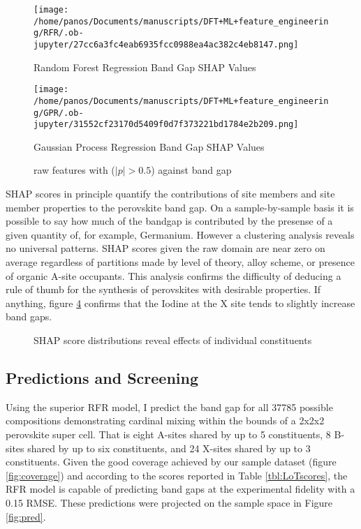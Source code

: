 \begin{figure}[htbp]
\centering
\texttt{[image: /home/panos/Documents/manuscripts/DFT+ML+feature\_engineering/RFR/.ob-jupyter/27cc6a3fc4eab6935fcc0988ea4ac382c4eb8147.png]}
\caption{\label{fig:rfrSHAP} Random Forest Regression Band Gap SHAP Values}
\end{figure}

\begin{figure}[htbp]
\centering
\texttt{[image: /home/panos/Documents/manuscripts/DFT+ML+feature\_engineering/GPR/.ob-jupyter/31552cf23170d5409f0d7f373221bd1784e2b209.png]}
\caption{\label{fig:gprSHAP} Gaussian Process Regression Band Gap SHAP Values}
\end{figure}

 
\begin{figure}[htbp]
\centering

\caption{\label{fig:rpear} raw features with (\(|p| > 0.5\)) against band gap}
\end{figure}

SHAP scores in principle quantify the contributions of site members and site member properties to the perovskite band gap.
On a sample-by-sample basis it is possible to say how much of the bandgap is contributed by the presense of a given quantity of, for example, Germanium.
However a clustering analysis reveals no universal patterns.
SHAP scores given the raw domain are near zero on average regardless of partitions made by level of theory, alloy scheme, or presence of organic A-site occupants.
This analysis confirms the difficulty of deducing a rule of thumb for the synthesis of perovskites with desirable properties.
If anything, figure \ref{fig:clusters} confirms that the Iodine at the X site tends to slightly increase band gaps.

 
\begin{figure}[htbp]
\centering

\caption{\label{fig:clusters} SHAP score distributions reveal effects of individual constituents}
\end{figure}

\subsection{Predictions and Screening}
\label{sec:org2194f76}
Using the superior RFR model, I predict the band gap for all 37785 possible compositions demonstrating cardinal mixing within the bounds of a 2x2x2 perovskite super cell.
That is eight A-sites shared by up to 5 constituents, 8 B-sites shared by up to six constituents, and 24 X-sites shared by up to 3 constituents.
Given the good coverage achieved by our sample dataset (figure \ref{fig:coverage}) and according to the scores reported in Table \ref{tbl:LoTscores}, the RFR model is capable of predicting band gaps at the experimental fidelity with a 0.15 RMSE.
These predictions were projected on the sample space in Figure \ref{fig:pred}.

